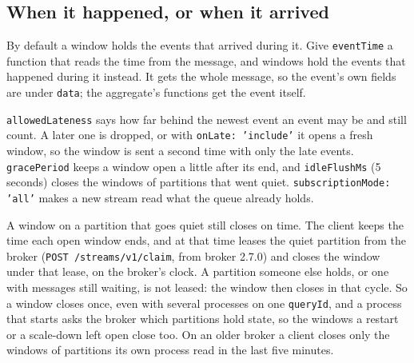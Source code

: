 



\subsection{When it happened, or when it arrived}

By default a window holds the events that arrived during it. Give \texttt{eventTime} a function that
reads the time from the message, and windows hold the events that happened during it instead. It
gets the whole message, so the event's own fields are under \texttt{data}; the aggregate's functions
get the event itself.


\texttt{allowedLateness} says how far behind the newest event an event may be and still count. A
later one is dropped, or with \texttt{onLate: 'include'} it opens a fresh window, so the window is
sent a second time with only the late events. \texttt{gracePeriod} keeps a window open a little
after its end, and \texttt{idleFlushMs} (5 seconds) closes the windows of partitions that went quiet.
\texttt{subscriptionMode: 'all'} makes a new stream read what the queue already holds.


A window on a partition that goes quiet still closes on time. The client keeps the time each open
window ends, and at that time leases the quiet partition from the broker
(\texttt{POST /streams/v1/claim}, from broker 2.7.0) and closes the window under that lease, on the
broker's clock. A partition someone else holds, or one with messages still waiting, is not leased:
the window then closes in that cycle. So a window closes once, even with several processes on one
\texttt{queryId}, and a process that starts asks the broker which partitions hold state, so the
windows a restart or a scale-down left open close too. On an older broker a client closes only the
windows of partitions its own process read in the last five minutes.

